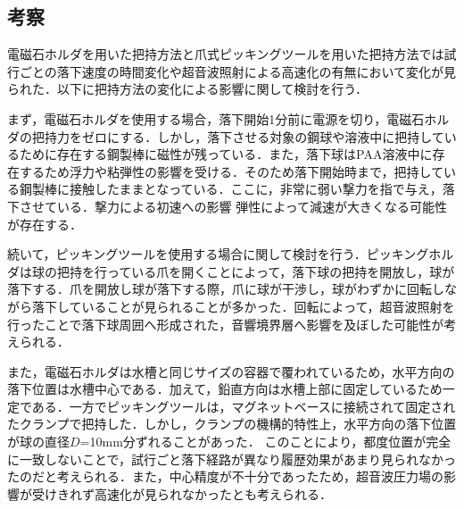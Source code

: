 \subsection{考察}

電磁石ホルダを用いた把持方法と爪式ピッキングツールを用いた把持方法では試行ごとの落下速度の時間変化や超音波照射による高速化の有無において変化が見られた．以下に把持方法の変化による影響に関して検討を行う．

まず，電磁石ホルダを使用する場合，落下開始1分前に電源を切り，電磁石ホルダの把持力をゼロにする．しかし，落下させる対象の鋼球や溶液中に把持しているために存在する鋼製棒に磁性が残っている．また，落下球はPAA溶液中に存在するため浮力や粘弾性の影響を受ける．そのため落下開始時まで，把持している鋼製棒に接触したままとなっている．ここに，非常に弱い撃力を指で与え，落下させている．撃力による初速への影響
弾性によって減速が大きくなる可能性が存在する．

続いて，ピッキングツールを使用する場合に関して検討を行う．ピッキングホルダは球の把持を行っている爪を開くことによって，落下球の把持を開放し，球が落下する．爪を開放し球が落下する際，爪に球が干渉し，球がわずかに回転しながら落下していることが見られることが多かった．回転によって，超音波照射を行ったことで落下球周囲へ形成された，音響境界層へ影響を及ぼした可能性が考えられる．

また，電磁石ホルダは水槽と同じサイズの容器で覆われているため，水平方向の落下位置は水槽中心である．加えて，鉛直方向は水槽上部に固定しているため一定である．一方でピッキングツールは，マグネットベースに接続されて固定されたクランプで把持した．しかし，クランプの機構的特性上，水平方向の落下位置が球の直径$D$=10mm分ずれることがあった．
このことにより，都度位置が完全に一致しないことで，試行ごと落下経路が異なり履歴効果があまり見られなかったのだと考えられる．また，中心精度が不十分であったため，超音波圧力場の影響が受けきれず高速化が見られなかったとも考えられる．
